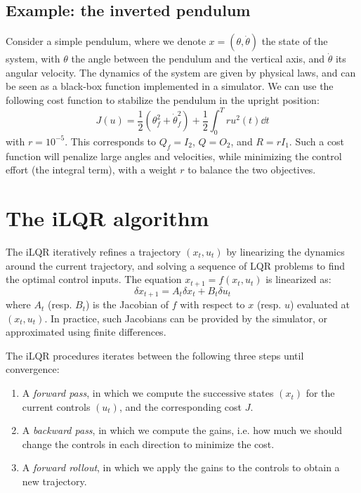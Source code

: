 \documentclass[nodate]{../cs-classes/cs-classes}
\begin{document}
\subsection{Example: the inverted pendulum}
Consider a simple pendulum, where we denote $x = (\theta, \dot{\theta})$ the state of the system, with $\theta$ the angle between the pendulum and the vertical axis, and $\dot{\theta}$ its angular velocity. The dynamics of the system are given by physical laws, and can be seen as a black-box function implemented in a simulator. We can use the following cost function to stabilize the pendulum in the upright position:
\begin{equation*}
    J(u) = \frac{1}{2}\left(\theta_f^2+\dot{\theta}_f^2\right) + \frac{1}{2}\int_0^T ru^2(t) \dd t
\end{equation*}
with $r=10^{-5}$. This corresponds to $Q_f = I_2$, $Q=O_2$, and $R=rI_1$. Such a cost function will penalize large angles and velocities, while minimizing the control effort (the integral term), with a weight $r$ to balance the two objectives.

\section{The iLQR algorithm}
The iLQR iteratively refines a trajectory $(x_t, u_t)$ by linearizing the dynamics around the current trajectory, and solving a sequence of LQR problems to find the optimal control inputs. The equation $x_{t+1} = f(x_t, u_t)$ is linearized as:
\begin{equation*}
    \delta x_{t+1} = A_t \delta x_t + B_t \delta u_t
\end{equation*}
where $A_t$ (resp. $B_t$) is the Jacobian of $f$ with respect to $x$ (resp. $u$) evaluated at $(x_t, u_t)$. In practice, such Jacobians can be provided by the simulator, or approximated using finite differences.

The iLQR procedures iterates between the following three steps until convergence:
\begin{enumerate}
    \item A \emph{forward pass}, in which we compute the successive states $(x_t)$ for the current controls $(u_t)$, and the corresponding cost $J$.
    \item A \emph{backward pass}, in which we compute the gains, i.e. how much we should change the controls in each direction to minimize the cost.
    \item A \emph{forward rollout}, in which we apply the gains to the controls to obtain a new trajectory.
\end{enumerate}
\end{document}
